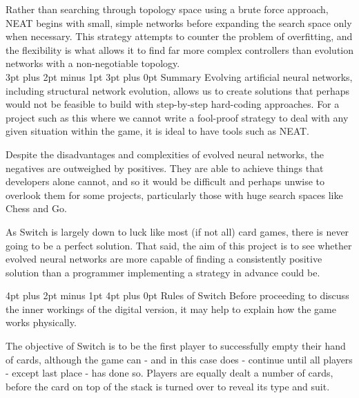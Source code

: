\documentclass[12pt,a4paper]{article}
\makeatletter
\renewcommand\subsection{\@startsection {subsection}{1}{2mm} %
                               {3pt plus 2pt minus 1pt} %
                               {3pt plus 0pt} %
                               {\normalfont\bfseries}}
\renewcommand\section{\@startsection {section}{1}{0mm} %
                               {4pt plus 2pt minus 1pt} %
                               {4pt plus 0pt} %
                               {\bfseries}}
\makeatother
\begin{document}
Rather than searching through topology space using a brute force approach, NEAT begins with small, simple networks before expanding the search space only when necessary\citep{EvolvingARovingEyeForGo}. This strategy attempts to counter the problem of overfitting, and the flexibility is what allows it to find far more complex controllers than evolution networks with a non-negotiable topology.\\


\subsection{Summary}
Evolving artificial neural networks, including structural network evolution, allows us to create solutions that perhaps would not be feasible to build with step-by-step hard-coding approaches. For a project such as this where we cannot write a fool-proof strategy to deal with any given situation within the game, it is ideal to have tools such as NEAT. 

Despite the disadvantages and complexities of evolved neural networks, the negatives are outweighed by positives. They are able to achieve things that developers alone cannot, and so it would be difficult and perhaps unwise to overlook them for some projects, particularly those with huge search spaces like Chess and Go.  

As Switch is largely down to luck like most (if not all) card games, there is never going to be a perfect solution. That said, the aim of this project is to see whether evolved neural networks are more capable of finding a consistently positive solution than a programmer implementing a strategy in advance could be. 

\newpage
\section{Rules of Switch}
Before proceeding to discuss the inner workings of the digital version, it may help to explain how the game works physically.

The objective of Switch is to be the first player to successfully empty their hand of cards, although the game can - and in this case does - continue until all players - except last place - has done so. Players are equally dealt a number of cards, before the card on top of the stack is turned over to reveal its type and suit. 
\end{document}

